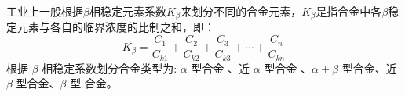 工业上一般根据$\beta$相稳定元素系数$K_{\beta}$来划分不同的合金元素，$K_{\beta}$是指合金中各$\beta$稳定元素与各自的临界浓度的比制之和，即：
\begin{equation}
K_{\beta}=\frac{ C_{1} }{C_{k1}}+\frac{ C_{2} }{C_{k2}}+\frac{ C_{3} }{C_{k3}}+\cdots+\frac{ C_{n} }{C_{kn}}
\end{equation}
根据 $\beta$ 相稳定系数划分合金类型为: $\alpha$ 型合金 、近 $\alpha$ 型合金 、$\alpha+\beta$ 型合金、近 $\beta$ 型合金、$\beta$ 型 合金。
%
%
%
%
%
%
